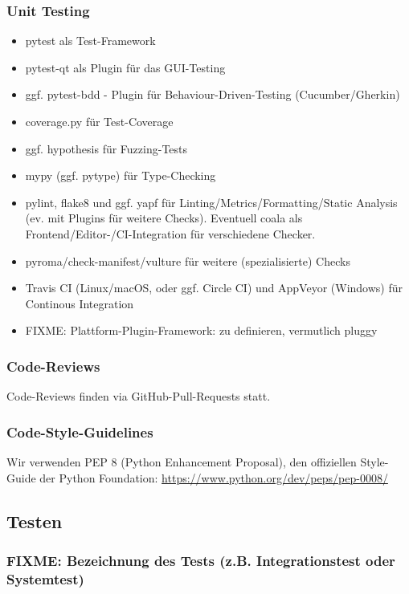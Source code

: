 \documentclass[a4paper]{article}
\begin{document}
\subsubsection{Unit Testing}
\begin{itemize}
\item pytest als Test-Framework
\item pytest-qt als Plugin für das GUI-Testing
\item ggf. pytest-bdd - Plugin für Behaviour-Driven-Testing (Cucumber/Gherkin)
\item coverage.py für Test-Coverage
\item ggf. hypothesis für Fuzzing-Tests
\item mypy (ggf. pytype) für Type-Checking
\item pylint, flake8 und ggf. yapf für Linting/Metrics/Formatting/Static Analysis (ev. mit Plugins für weitere Checks). Eventuell coala als Frontend/Editor-/CI-Integration für verschiedene Checker.
\item pyroma/check-manifest/vulture für weitere (spezialisierte) Checks
\item Travis CI (Linux/macOS, oder ggf. Circle CI) und AppVeyor (Windows) für Continous Integration
\item FIXME: Plattform-Plugin-Framework: zu definieren, vermutlich pluggy
\end{itemize}

\subsubsection{Code-Reviews}
Code-Reviews finden via GitHub-Pull-Requests statt.

\subsubsection{Code-Style-Guidelines}
Wir verwenden PEP 8 (Python Enhancement Proposal), den offiziellen Style-Guide der Python Foundation:
\url{https://www.python.org/dev/peps/pep-0008/}

\subsection{Testen}
\subsubsection {FIXME: Bezeichnung des Tests (z.B. Integrationstest oder Systemtest)}
\end{document}

